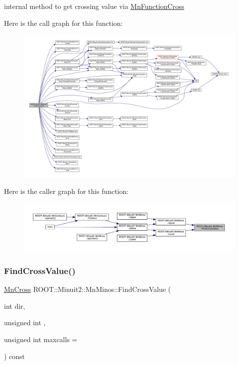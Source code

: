 internal method to get crossing value via \mbox{\hyperlink{classROOT_1_1Minuit2_1_1MnFunctionCross}{Mn\+Function\+Cross}} 

Here is the call graph for this function\+:\nopagebreak
\begin{figure}[H]
\begin{center}
\leavevmode
\includegraphics[width=350pt]{dc/d91/classROOT_1_1Minuit2_1_1MnMinos_a4b8df109769bd0bee2127da68615bb11_cgraph}
\end{center}
\end{figure}
Here is the caller graph for this function\+:\nopagebreak
\begin{figure}[H]
\begin{center}
\leavevmode
\includegraphics[width=350pt]{dc/d91/classROOT_1_1Minuit2_1_1MnMinos_a4b8df109769bd0bee2127da68615bb11_icgraph}
\end{center}
\end{figure}
\mbox{\label{classROOT_1_1Minuit2_1_1MnMinos_a4b8df109769bd0bee2127da68615bb11}} 
\subsubsection{\texorpdfstring{FindCrossValue()}{FindCrossValue()}\hspace{0.1cm}{\footnotesize\ttfamily [2/2]}}
{\footnotesize\ttfamily \mbox{\hyperlink{classROOT_1_1Minuit2_1_1MnCross}{Mn\+Cross}} R\+O\+O\+T\+::\+Minuit2\+::\+Mn\+Minos\+::\+Find\+Cross\+Value (\begin{DoxyParamCaption}\item[{int}]{dir,  }\item[{unsigned int}]{,  }\item[{unsigned int}]{maxcalls = {} }\end{DoxyParamCaption}) const\hspace{0.3cm}{\ttfamily [protected]}}



